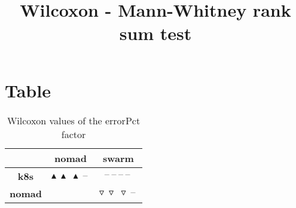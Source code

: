 \documentclass{article}
\title{Wilcoxon - Mann-Whitney rank sum test}
\author{}
\begin{document}
\maketitle
\section{Table}
\begin{table}[!htp]
  \caption{Wilcoxon values of the errorPct factor}
  \label{table:errorPct}
  \centering
  \begin{scriptsize}
  \begin{tabular}{c|cc}
      & \textbf{nomad} & \textbf{swarm} \\\hline
      \textbf{k8s} & $\blacktriangle\ \blacktriangle\ \blacktriangle\ \text{--}\  $ & $ \text{--}\ \text{--}\ \text{--}\ \text{--}\ $ \\
      \textbf{nomad} & $ $ & $ \triangledown\ \triangledown\ \triangledown\ \text{--}\ $ \\
  \end{tabular}
  \end{scriptsize}
\end{table}
\end{document}

